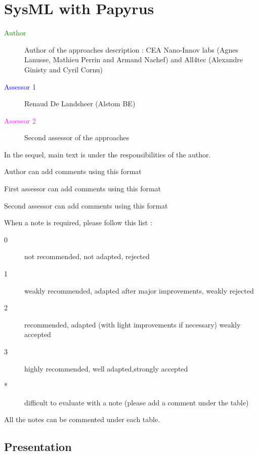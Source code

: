 \chapter{SysML with Papyrus}

\begin{description}
\item[\textcolor{green}{Author}] Author of the approaches description : CEA Nano-Innov labs (Agnes Lanusse, Mathieu Perrin and Armand Nachef) and All4tec (Alexandre Ginisty and Cyril Cornu)
\item[\textcolor{blue}{Assessor 1}] Renaud De Landsheer (Alstom BE)
\item[\textcolor{magenta}{Assessor 2}] Second assessor of the approaches 
\end{description}

In the sequel, main text is under the responsibilities of the author.

\begin{author_comment}
Author can add comments using this format
\end{author_comment}

\begin{assessor1}
First assessor can add comments using this format
\end{assessor1}

\begin{assessor2}
Second assessor can add comments using this format
\end{assessor2}

When a note is required, please follow this list :
\begin{description}
\item[0] not recommended, not adapted, rejected
\item[1] weakly recommended, adapted after major improvements, weakly rejected
\item[2] recommended, adapted (with light improvements if necessary) weakly accepted
\item[3] highly recommended, well adapted,strongly accepted
\item[*] difficult to evaluate with a note (please add a comment under the table)
\end{description}

All the notes can be commented under each table.

\section{Presentation}

